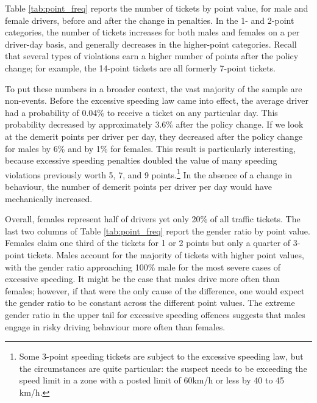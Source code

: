 

Table \ref{tab:point_freq} reports 
the number of tickets by point value, 
for male and female drivers, before and after the
change in penalties. 
%
In the 1- and 2-point categories, the number of tickets increases 
for both males and females on a per driver-day basis, 
and generally decreases in the higher-point categories. 
% 
Recall that several types of violations
earn a higher number of points after the policy change; 
for example, 
the 14-point tickets are all formerly 7-point tickets.

To put these numbers in a broader context, 
the vast majority of the sample are non-events. 
Before the excessive speeding law came into effect, 
the average driver had a probability of 0.04\% to receive a ticket 
on any particular day. 
This probability decreased by approximately 3.6\% after the policy change. 
If we look at the demerit points per driver per day, 
they decreased after the policy change for males by 6\% and by 1\% for females. 
This result is particularly interesting, 
because excessive speeding penalties doubled the value of many 
speeding violations previously worth 5, 7, and 9 points.\footnote{%
Some 3-point speeding tickets are subject to the excessive speeding law, 
but the circumstances are quite particular: 
the suspect needs to be exceeding the speed limit in a zone 
with a posted limit of 60km/h or less by 40 to 45 km/h.}
In the absence of a change in behaviour, 
the number of demerit points per driver per day 
would have mechanically increased. 


Overall, females represent half of drivers 
yet only 20\% of all traffic tickets. 
%
The last two columns of
Table \ref{tab:point_freq}
report the gender ratio by point value.
% 
Females claim one third of the tickets for 1 or 2 points
but only a quarter of 3-point tickets. 
Males account for the majority of tickets with higher point values, 
with the gender ratio approaching 100\% male 
for the most severe cases of excessive speeding. 
% 
It might be the case that males drive more often than females; 
however, if that were the only cause of the difference, one would 
expect the gender ratio to be constant across the different point values. 
%
The extreme gender ratio in the upper tail for excessive speeding offences 
suggests that males engage in risky driving behaviour 
more often than females. 


